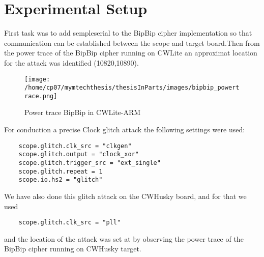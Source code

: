 \section{Experimental Setup}
First task was to add sempleserial to the BipBip cipher implementation so that communication can be established between the scope and target board.Then from the power trace of the BipBip cipher running on CWLite an approximat location for the attack was identified (10820,10890).
\begin{figure}[h]
    \centering
    \texttt{[image: /home/cp07/mymtechthesis/thesisInParts/images/bipbip\_powertrace.png]}
    \caption{Power trace BipBip in CWLite-ARM}
    \label{fig:bipbip_powertrace}
\end{figure}
For conduction a precise Clock glitch attack the following settings were used:
\begin{verbatim}
    scope.glitch.clk_src = "clkgen"
    scope.glitch.output = "clock_xor"
    scope.glitch.trigger_src = "ext_single"
    scope.glitch.repeat = 1
    scope.io.hs2 = "glitch"
\end{verbatim}
We have also done this glitch attack on the CWHusky board, and for that we used 
\begin{verbatim}
    scope.glitch.clk_src = "pll"
\end{verbatim}
and the location of the attack was set at by observing the power trace of the BipBip cipher running on CWHusky target.

